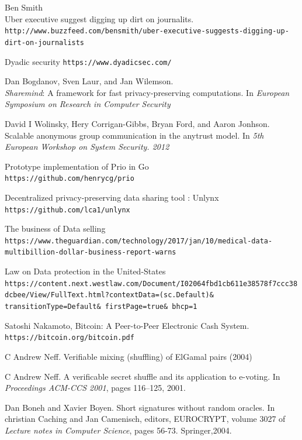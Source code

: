 \documentclass{article}
\begin{document}
\begin{thebibliography}{9}
Ben Smith\\
Uber executive suggest digging up dirt on journalits.
\\\texttt{http://www.buzzfeed.com/bensmith/uber-executive-suggests-digging-up-dirt-on-journalists}

Dyadic security \texttt{https://www.dyadicsec.com/}

Dan Bogdanov, Sven Laur, and Jan Wilemson.\\
\textit{Sharemind}: A framework for fast privacy-preserving computations. In \textit{European Symposium on Research in Computer Security}

David I Wolinsky, Hery Corrigan-Gibbs, Bryan Ford, and Aaron Jonhson.\\
Scalable anonymous group communication in the anytrust model. In \textit{5th European Workshop on System Security. 2012}


Prototype implementation of Prio in Go
\\\texttt{https://github.com/henrycg/prio}

Decentralized privacy-preserving data sharing tool : Unlynx\\
\texttt{https://github.com/lca1/unlynx}

The business of Data selling\\
\begingroup
\fontsize{8pt}{10pt}
\texttt{https://www.theguardian.com/technology/2017/jan/10/medical-data-multibillion-dollar-business-report-warns}
\endgroup

Law on Data protection in the United-States\\
\begingroup
\fontsize{8pt}{10pt}
\texttt{https://content.next.westlaw.com/Document/I02064fbd1cb611e38578f7ccc38dcbee/View/FullText.html?contextData=(sc.Default)\& transitionType=Default\& firstPage=true\& bhcp=1}
\endgroup


Satoshi Nakamoto, Bitcoin: A Peer-to-Peer Electronic Cash System.\\
\texttt{https://bitcoin.org/bitcoin.pdf}

C Andrew Neff. Verifiable mixing (shuffling) of ElGamal pairs (2004)

C Andrew Neff. A verificable secret shuffle and its application to e-voting. In \textit{Proceedings ACM-CCS 2001}, pages 116--125, 2001.

Dan Boneh and Xavier Boyen. Short signatures without random oracles. In christian Caching and Jan Camenisch, editors, EUROCRYPT, volume 3027 of \textit{Lecture notes in Computer Science}, pages 56-73. Springer,2004.


\end{thebibliography}
\end{document}
